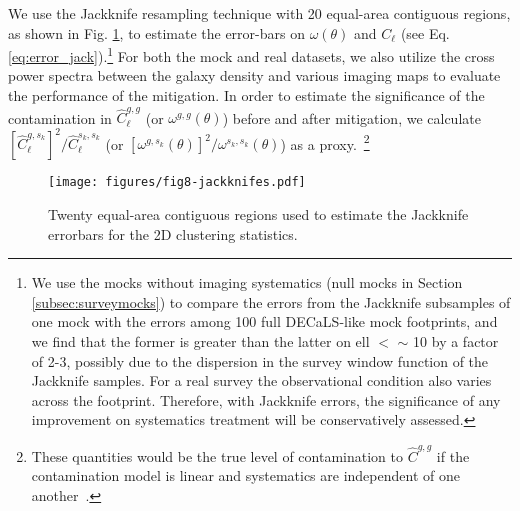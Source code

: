 We use the Jackknife resampling technique with 20 equal-area contiguous regions, as shown in Fig. \ref{fig:jackknifes}, to estimate the error-bars on $\omega (\theta)$ and $C_{\ell}$ (see Eq. \ref{eq:error_jack}).\footnote{We use the mocks without imaging systematics (null mocks in Section \ref{subsec:surveymocks}) to compare the errors from the Jackknife subsamples of one mock with the errors among 100 full  DECaLS-like mock footprints, and we find that the former is greater than the latter on ell $<$ $\sim$ 10 by a factor of 2-3, possibly due to the dispersion in the survey window function of the Jackknife samples. For a real survey the observational condition also varies across the footprint. Therefore, with Jackknife errors, the significance of any improvement on systematics treatment will be conservatively assessed.} For both the mock and real datasets, we also utilize the cross power spectra between the galaxy density and various imaging maps to evaluate the performance of the mitigation. In order to estimate the significance of the contamination in $\hat{C}^{g,g}_{\ell}$ (or $\omega^{g,g} (\theta)$) before and after mitigation, we calculate $[\hat{C}^{g,s_k}_{\ell}]^2/\hat{C}^{s_k,s_k}_{\ell}$ (or $[\omega^{g,s_k}(\theta)]^2/\omega^{s_k,s_k}(\theta)$) as a proxy.~\footnote{These quantities would be the true level of contamination to $\hat{C}^{g,g}$ if the contamination model is linear and systematics are independent of one another~\citep{ashley2012MNRAS,2012ApJ...761...14H}.}
\begin{figure}
        \centering
        \texttt{[image: figures/fig8-jackknifes.pdf]}
        \caption{Twenty equal-area contiguous regions used to estimate the Jackknife errorbars for the 2D clustering statistics.}
        \label{fig:jackknifes}
\end{figure}
    

